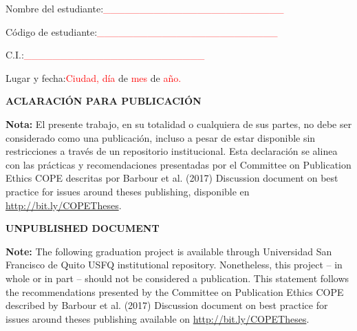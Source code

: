 \IfFileExists{IEEEtran.cls}{\documentclass[journal]{IEEEtran}}{\documentclass[twocolumn]{article}}
\newenvironment{customfontsize}{
    \fontsize{12}{14}\selectfont
}{}
\begin{document}
\begin{customfontsize}
\vspace{30pt}

Nombre del estudiante:\hspace{4cm}\textcolor{red}  {\_\_\_\_\_\_\_\_\_\_\_\_\_\_\_\_\_\_\_\_\_\_\_\_\_}\\
\vspace{30pt}

Código de estudiante:\hspace{4.2cm}\textcolor{red}{\_\_\_\_\_\_\_\_\_\_\_\_\_\_\_\_\_\_\_\_\_\_\_\_\_}\\
\vspace{30pt}

C.I.:\hspace{7.3cm}\textcolor{red}{\_\_\_\_\_\_\_\_\_\_\_\_\_\_\_\_\_\_\_\_\_\_\_\_\_}\\
\vspace{30pt}

Lugar y fecha:\hspace{5.4cm}\textcolor{red}{Ciudad, día} de \textcolor{red}{mes} de \textcolor{red}{año.}

\end{customfontsize}


\newpage

\begin{center}
\textbf{\fontsize{14}{16}\selectfont ACLARACIÓN PARA PUBLICACIÓN}\\
\end{center}
\vspace{10pt}

\fontsize{12}{14}\selectfont \textbf{Nota:} El presente trabajo, en su totalidad o cualquiera de sus partes, no debe ser considerado como una publicación, incluso a pesar de estar disponible sin restricciones a través de un repositorio institucional. Esta declaración se alinea con las prácticas y recomendaciones presentadas por el Committee on Publication Ethics COPE descritas por Barbour et al. (2017) Discussion document on best practice for issues around theses publishing, disponible en \url{http://bit.ly/COPETheses}.
\vspace{10pt}
\begin{center}
\textbf{\fontsize{14}{16}\selectfont UNPUBLISHED DOCUMENT}\\
\end{center}
\vspace{10pt}
\fontsize{12}{14}\selectfont \textbf{Note:} The following graduation project is available through Universidad San Francisco de Quito USFQ institutional repository. Nonetheless, this project -- in whole or in part -- should not be considered a publication. This statement follows the recommendations presented by the Committee on Publication Ethics COPE described by Barbour et al. (2017) Discussion document on best practice for issues around theses publishing available on \url{http://bit.ly/COPETheses}.
\end{document}
